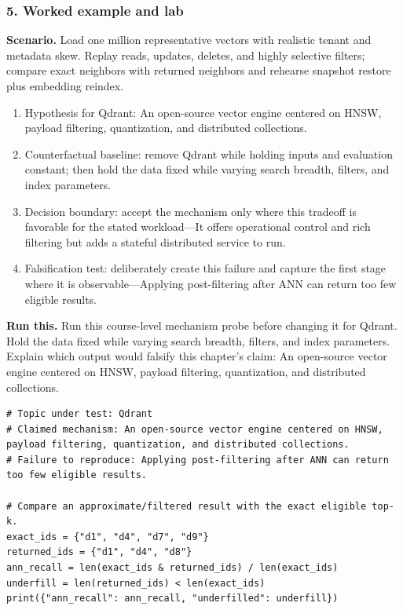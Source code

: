 \subsubsection*{5. Worked example and lab}
\textbf{Scenario.} Load one million representative vectors with realistic tenant and metadata skew. Replay reads, updates, deletes, and highly selective filters; compare exact neighbors with returned neighbors and rehearse snapshot restore plus embedding reindex.
\begin{enumerate}
\item Hypothesis for Qdrant: An open-source vector engine centered on HNSW, payload filtering, quantization, and distributed collections.
\item Counterfactual baseline: remove Qdrant while holding inputs and evaluation constant; then hold the data fixed while varying search breadth, filters, and index parameters.
\item Decision boundary: accept the mechanism only where this tradeoff is favorable for the stated workload—It offers operational control and rich filtering but adds a stateful distributed service to run.
\item Falsification test: deliberately create this failure and capture the first stage where it is observable—Applying post-filtering after ANN can return too few eligible results.
\end{enumerate}
\textbf{Run this.} Run this course-level mechanism probe before changing it for Qdrant. Hold the data fixed while varying search breadth, filters, and index parameters. Explain which output would falsify this chapter's claim: An open-source vector engine centered on HNSW, payload filtering, quantization, and distributed collections.
\begin{Verbatim}[fontsize=\scriptsize]
# Topic under test: Qdrant
# Claimed mechanism: An open-source vector engine centered on HNSW, payload filtering, quantization, and distributed collections.
# Failure to reproduce: Applying post-filtering after ANN can return too few eligible results.

# Compare an approximate/filtered result with the exact eligible top-k.
exact_ids = {"d1", "d4", "d7", "d9"}
returned_ids = {"d1", "d4", "d8"}
ann_recall = len(exact_ids & returned_ids) / len(exact_ids)
underfill = len(returned_ids) < len(exact_ids)
print({"ann_recall": ann_recall, "underfilled": underfill})
\end{Verbatim}
